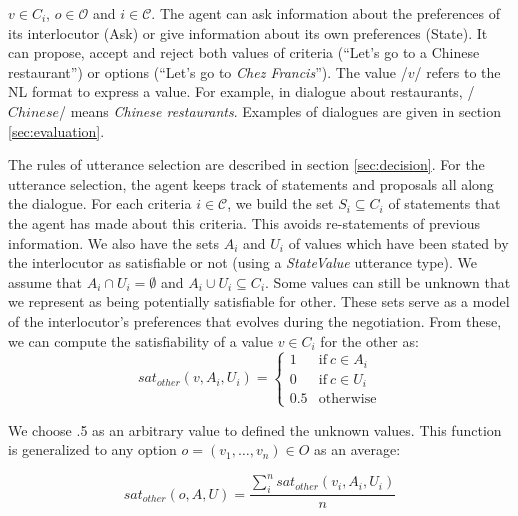 \documentclass{llncs}
\begin{document}
	$v \in C_i$,  $o \in \mathcal{O}$ and $i \in \mathcal{C}$.
	The agent can ask information about the preferences of its interlocutor (Ask) or give information about its own preferences (State). It can propose, accept and reject both values of criteria (``Let's go to a Chinese restaurant'') or options (``Let's go to \emph{Chez Francis}''). The value /$v$/ refers to the NL format to express a value. For example, in dialogue about restaurants, /$Chinese$/ means \textit{Chinese restaurants}. 
	Examples of dialogues are given in section \ref{sec:evaluation}.
	
	\medskip
	The rules of utterance selection are described in section \ref{sec:decision}. For the utterance selection, the agent keeps track of statements and proposals all along the dialogue. For each criteria $i\in\mathcal{C}$, we build the set $S_i \subseteq C_i$ of statements that the agent has made about this criteria. This avoids re-statements of previous information. We also have the sets $A_i$ and $U_i$ of values which have been stated by the interlocutor as satisfiable or not (using a \emph{StateValue} utterance type). We assume that $A_i\cap U_i=\emptyset$ and $A_i\cup U_i\subseteq C_i$. Some values can still be unknown that we represent as being potentially satisfiable for other. These sets serve as a model of the interlocutor's preferences that evolves during the negotiation. From these, we can compute the satisfiability of a value $v\in C_i$ for the other as:
		\vspace{-0.5em} 
	\begin{equation}
	sat_{other}(v, A_i, U_i)= \left\{\begin{array}{ll}
	1	 & \mathrm{if\ }  c \in A_i\\
	0    & \mathrm{if\ }c \in U_i\\
	0.5	 & \mathrm{otherwise}
	\end{array}\right.
	\end{equation}
	
	We choose .5 as an arbitrary value to defined the unknown values. This function is generalized to any option $o=(v_1,\ldots,v_n) \in O$ as an average:
	
	\begin{equation}
	sat_{other}(o, A, U) = \frac{ \sum_{i}^{n} sat_{other}(v_i, A_i, U_i) } {n}
	\end{equation}
	
\end{document}
